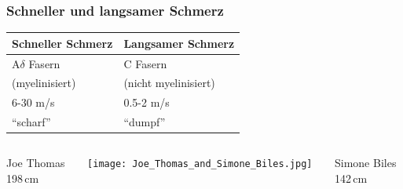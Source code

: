 \documentclass{beamer}
\begin{document}
\begin{frame}
\frametitle{Schneller und langsamer Schmerz}

\begin{center}

\begin{tabular}{|l|l|}
\hline
Schneller Schmerz       & Langsamer Schmerz \\
\hline
A\(\delta\) Fasern     & C Fasern \\
(myelinisiert)          & (nicht myelinisiert) \\
6-30 m/s                & 0.5-2 m/s \\
``scharf''              & ``dumpf'' \\
\hline
\end{tabular}

\end{center}



\begin{columns}[c]


\begin{column}{2.5cm}
\begin{flushright}
Joe Thomas \\
198\,cm \\
\end{flushright}
\end{column}


\begin{column}{6cm}
\begin{center}
\texttt{[image: Joe\_Thomas\_and\_Simone\_Biles.jpg]}
\end{center}

\end{column}

\begin{column}{2.5cm}
Simone Biles \\
 	142\,cm  \\
\end{column}


\end{columns}



\end{frame}
\end{document}
